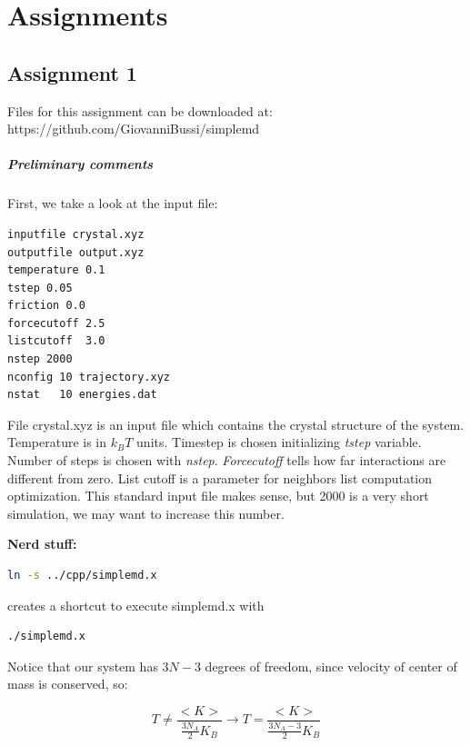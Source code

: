 \documentclass[a4paper, italian, openany]{book}
\begin{document}
\chapter{Assignments}

\section{Assignment 1}

Files for this assignment can be downloaded at: https://github.com/GiovanniBussi/simplemd

\paragraph{Preliminary comments}

First, we take a look at the input file:

\begin{lstlisting}
inputfile crystal.xyz
outputfile output.xyz
temperature 0.1
tstep 0.05
friction 0.0
forcecutoff 2.5
listcutoff  3.0
nstep 2000
nconfig 10 trajectory.xyz
nstat   10 energies.dat
\end{lstlisting}

File crystal.xyz is an input file which contains the crystal structure of the system. Temperature is in $k_B T$ units. Timestep is chosen initializing \textit{tstep} variable. Number of steps is chosen with \textit{nstep}. \textit{Forcecutoff} tells how far interactions are different from zero. List cutoff is a parameter for neighbors list computation optimization.\newline
This standard input file makes sense, but 2000 is a very short simulation, we may want to increase this number.

\medskip

\textbf{Nerd stuff:} 
\begin{lstlisting}[language=bash]
ln -s ../cpp/simplemd.x
\end{lstlisting}

creates a shortcut to execute simplemd.x with

\begin{lstlisting}[language=bash]
./simplemd.x
\end{lstlisting}

Notice that our system has $3N-3$ degrees of freedom, since velocity of center of mass is conserved, so:

$$T \ne \frac{<K>}{\frac{3N_A}{2} K_B} \rightarrow T = \frac{<K>}{\frac{3N_A-3}{2} K_B} $$
\end{document}
